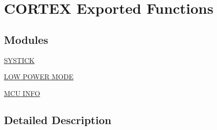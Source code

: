 \hypertarget{group___c_o_r_t_e_x___l_l___exported___functions}{}\section{C\+O\+R\+T\+EX Exported Functions}
\label{group___c_o_r_t_e_x___l_l___exported___functions}
\subsection*{Modules}
\begin{DoxyCompactItemize}
\item 
\hyperlink{group___c_o_r_t_e_x___l_l___e_f___s_y_s_t_i_c_k}{S\+Y\+S\+T\+I\+CK}
\item 
\hyperlink{group___c_o_r_t_e_x___l_l___e_f___l_o_w___p_o_w_e_r___m_o_d_e}{L\+O\+W P\+O\+W\+E\+R M\+O\+DE}
\item 
\hyperlink{group___c_o_r_t_e_x___l_l___e_f___m_c_u___i_n_f_o}{M\+C\+U I\+N\+FO}
\end{DoxyCompactItemize}


\subsection{Detailed Description}
